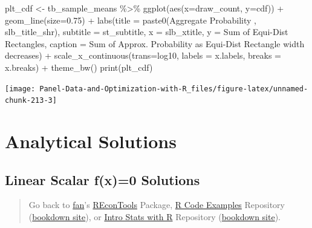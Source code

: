 \documentclass[
]{book}
\newenvironment{Shaded}{\begin{snugshade}}{\end{snugshade}}
\newcommand{\AttributeTok}[1]{\textcolor[rgb]{0.77,0.63,0.00}{#1}}
\newcommand{\FloatTok}[1]{\textcolor[rgb]{0.00,0.00,0.81}{#1}}
\newcommand{\FunctionTok}[1]{\textcolor[rgb]{0.00,0.00,0.00}{#1}}
\newcommand{\NormalTok}[1]{#1}
\newcommand{\OtherTok}[1]{\textcolor[rgb]{0.56,0.35,0.01}{#1}}
\newcommand{\SpecialCharTok}[1]{\textcolor[rgb]{0.00,0.00,0.00}{#1}}
\newcommand{\StringTok}[1]{\textcolor[rgb]{0.31,0.60,0.02}{#1}}
\begin{document}
\begin{Shaded}
\begin{Highlighting}[]
\NormalTok{plt\_cdf }\OtherTok{\textless{}{-}}\NormalTok{ tb\_sample\_means }\SpecialCharTok{\%\textgreater{}\%}
  \FunctionTok{ggplot}\NormalTok{(}\FunctionTok{aes}\NormalTok{(}\AttributeTok{x=}\NormalTok{draw\_count, }\AttributeTok{y=}\NormalTok{cdf)) }\SpecialCharTok{+}
  \FunctionTok{geom\_line}\NormalTok{(}\AttributeTok{size=}\FloatTok{0.75}\NormalTok{) }\SpecialCharTok{+}
  \FunctionTok{labs}\NormalTok{(}\AttributeTok{title =} \FunctionTok{paste0}\NormalTok{(}\StringTok{\textquotesingle{}Aggregate Probability \textquotesingle{}}\NormalTok{, slb\_title\_shr),}
       \AttributeTok{subtitle =}\NormalTok{ st\_subtitle,}
       \AttributeTok{x =}\NormalTok{ slb\_xtitle,}
       \AttributeTok{y =} \StringTok{\textquotesingle{}Sum of Equi{-}Dist Rectangles\textquotesingle{}}\NormalTok{,}
       \AttributeTok{caption =} \StringTok{\textquotesingle{}Sum of Approx. Probability as Equi{-}Dist Rectangle width decreases\textquotesingle{}}\NormalTok{) }\SpecialCharTok{+}
  \FunctionTok{scale\_x\_continuous}\NormalTok{(}\AttributeTok{trans=}\StringTok{\textquotesingle{}log10\textquotesingle{}}\NormalTok{, }\AttributeTok{labels =}\NormalTok{ x.labels, }\AttributeTok{breaks =}\NormalTok{ x.breaks) }\SpecialCharTok{+}
  \FunctionTok{theme\_bw}\NormalTok{()}
\FunctionTok{print}\NormalTok{(plt\_cdf)}
\end{Highlighting}
\end{Shaded}

\begin{center}\texttt{[image: Panel-Data-and-Optimization-with-R\_files/figure-latex/unnamed-chunk-213-3]} \end{center}

\hypertarget{analytical-solutions}{%
\section{Analytical Solutions}\label{analytical-solutions}}

\hypertarget{linear-scalar-fx0-solutions}{%
\subsection{Linear Scalar f(x)=0 Solutions}\label{linear-scalar-fx0-solutions}}

\begin{quote}
Go back to \href{http://fanwangecon.github.io/}{fan}'s \href{https://fanwangecon.github.io/REconTools/}{REconTools} Package, \href{https://fanwangecon.github.io/R4Econ/}{R Code Examples} Repository (\href{https://fanwangecon.github.io/R4Econ/bookdown}{bookdown site}), or \href{https://fanwangecon.github.io/Stat4Econ/}{Intro Stats with R} Repository (\href{https://fanwangecon.github.io/Stat4Econ/bookdown}{bookdown site}).
\end{quote}
\end{document}
